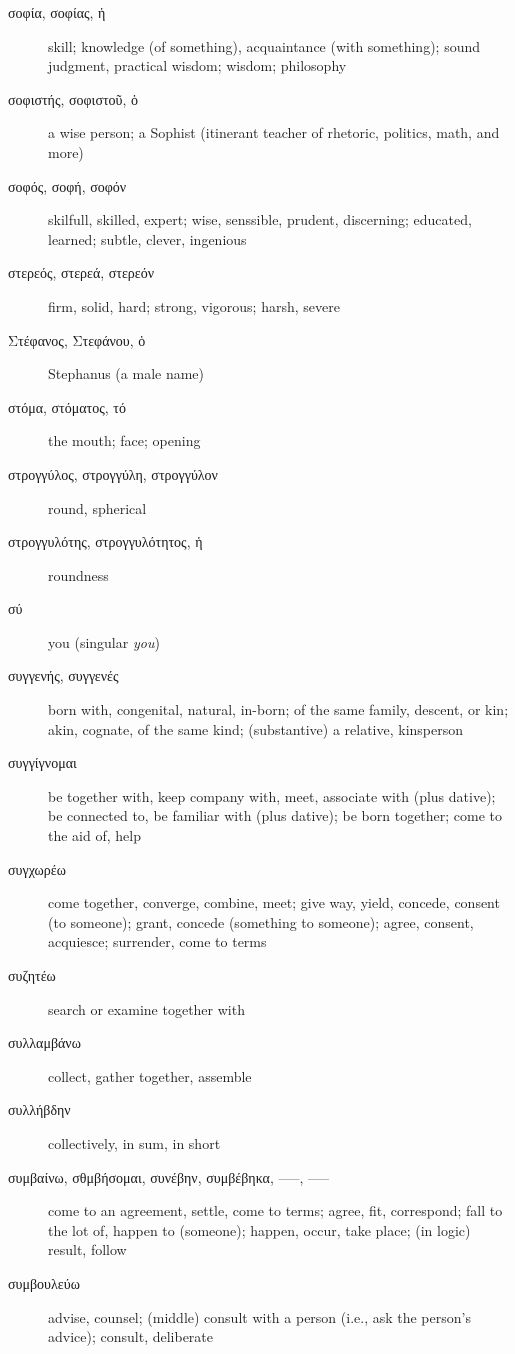 \documentclass[12pt,letterpaper]{article}
\begin{document}
\begin{description}
    \item[\textgreek{σοφία, σοφίας, ἡ}] skill; knowledge (of something), acquaintance (with something); sound judgment, practical wisdom; wisdom; philosophy
    \item[\textgreek{σοφιστής, σοφιστοῦ, ὁ}] a wise person; a Sophist (itinerant teacher of rhetoric, politics, math, and more)
    \item[\textgreek{σοφός, σοφή, σοφόν}] \marginnote{*}skilfull, skilled, expert; wise, senssible, prudent, discerning; educated, learned; subtle, clever, ingenious
    \item[\textgreek{στερεός, στερεά, στερεόν}] firm, solid, hard; strong, vigorous; harsh, severe
    \item[\textgreek{Στέφανος, Στεφάνου, ὁ}] Stephanus (a male name)
    \item[\textgreek{στόμα, στόματος, τό}] \marginnote{*}the mouth; face; opening
    \item[\textgreek{στρογγύλος, στρογγύλη, στρογγύλον}] round, spherical
    \item[\textgreek{στρογγυλότης, στρογγυλότητος, ἡ}] roundness
    \item[\textgreek{σύ}] you (singular \textit{you})
    \item[\textgreek{συγγενής, συγγενές}] born with, congenital, natural, in-born; of the same family, descent, or kin; akin, cognate, of the same kind; (substantive) a relative, kinsperson
    \item[\textgreek{συγγίγνομαι}] be together with, keep company with, meet, associate with (plus dative); be connected to, be familiar with (plus dative); be born together; come to the aid of, help
    \item[\textgreek{συγχωρέω}] come together, converge, combine, meet; give way, yield, concede, consent (to someone); grant, concede (something to someone); agree, consent, acquiesce; surrender, come to terms
    \item[\textgreek{συζητέω}] search or examine together with
    \item[\textgreek{συλλαμβάνω}] collect, gather together, assemble
    \item[\textgreek{συλλήβδην}] collectively, in sum, in short
    \item[\textgreek{συμβαίνω, σθμβήσομαι, συνέβην, συμβέβηκα, –––, –––}] \marginnote{*}come to an agreement, settle, come to terms; agree, fit, correspond; fall to the lot of, happen to (someone); happen, occur, take place; (in logic) result, follow
    \item[\textgreek{συμβουλεύω}] advise, counsel; (middle) consult with a person (i.e., ask the person's advice); consult, deliberate

\end{description}
\end{document}

